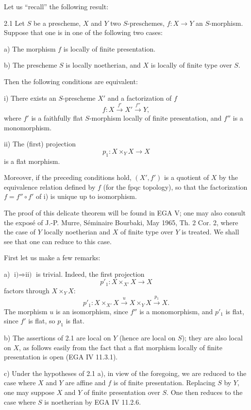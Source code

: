 Let us ``recall'' the following result:
\begin{theorem}{2.1}\label{XVI.2.1}
Let $S$ be a prescheme, $X$ and $Y$ two $S$-preschemes, $f:X\to Y$ an $S$-morphism. Suppose that one is in one of the following two cases:

\noindent a) The morphism $f$ is locally of finite presentation.

\noindent b) The prescheme $S$ is locally noetherian, and $X$ is locally of finite type over $S$.

Then the following conditions are equivalent:

\noindent i) There exists an $S$-prescheme $X'$ and a factorization of $f$
\[
f:X\xrightarrow{f'}X'\xrightarrow{f''}Y,
\]
where $f'$ is a faithfully flat $S$-morphism locally of finite presentation, and $f''$ is a monomorphism.

\noindent ii) The (first) projection
\[
p_1:X\times_Y X\longrightarrow X
\]
is a flat morphism.

Moreover, if the preceding conditions hold, $(X',f')$ is a quotient of $X$ by the equivalence relation defined by $f$ (for the fpqc topology), so that the factorization $f=f''\circ f'$ of i) is unique up to isomorphism.
\end{theorem}
The proof of this delicate theorem will be found in EGA V; one may also consult the exposé of J.-P. Murre, Séminaire Bourbaki, May 1965,  Th. 2 Cor. 2, where the case of $Y$ locally noetherian and $X$ of finite type over $Y$ is treated. We shall see that one can reduce to this case.

First let us make a few remarks:

\noindent a) $\text{i)}\Rightarrow\text{ii)}$ is trivial. Indeed, the first projection
\[
p'_1:X\times_{X'}X\longrightarrow X
\]
factors through $X\times_Y X$:
\[
p'_1:X\times_{X'}X\xrightarrow{u}X\times_Y X\xrightarrow{p_1}X.
\]
The morphism $u$ is an isomorphism, since $f''$ is a monomorphism, and $p'_1$ is flat, since $f'$ is flat, so $p_1$ is flat.

\noindent b) The assertions of 2.1 are local on $Y$ (hence are local on $S$); they are also local on $X$, as follows easily from the fact that a flat morphism locally of finite presentation is open (EGA IV 11.3.1).

\noindent c) Under the hypotheses of 2.1 a), in view of the foregoing, we are reduced to the case where $X$ and $Y$ are affine and $f$ is of finite presentation. Replacing $S$ by $Y$, one may suppose $X$ and $Y$ of finite presentation over $S$. One then reduces to the case where $S$ is noetherian by EGA IV 11.2.6.

